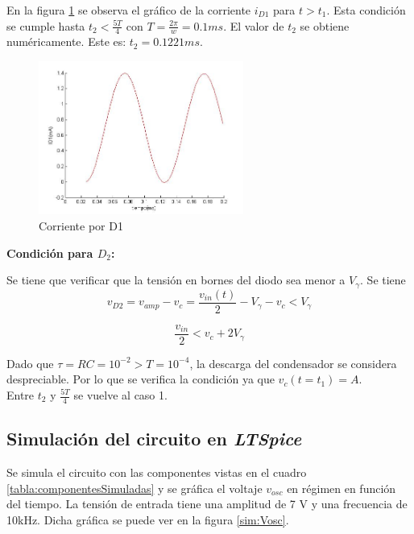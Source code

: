 En la figura \ref{fig:id1} se observa el gráfico de la corriente $i_{D1}$ para $t>t_1$. Esta condición se cumple hasta $t_2<\frac{5T}{4}$ con $T = \frac{2\pi}{w} = 0.1ms$. El valor de $t_2$ se obtiene numéricamente. Este es: $t_2 = 0.1221ms$.

\begin{figure}[H]
\centering
\includegraphics[width=0.6\textwidth]{DetectorDePicos/id1.jpg}
\caption{Corriente por D1}
\label{fig:id1}
\end{figure}

{\large \bf Condición para $D_2$:}

Se tiene que verificar que la tensión en bornes del diodo sea menor a $V_\gamma$. Se tiene
\begin{equation*}
	v_{D2} = v_{amp}-v_c = \frac{v_{in}(t)}{2} - V_\gamma -v_c < V_\gamma
\end{equation*}

\begin{equation*}
	\frac{v_{in}}{2} < v_c+2V_\gamma
\end{equation*}

Dado que $\tau = RC = 10^{-2} > T=10^{-4}$, la descarga del condensador se considera despreciable. Por lo que se verifica la condición ya que $v_c(t=t_1) = A$.\\

Entre $t_2$ y $\frac{5T}{4}$ se vuelve al caso 1.


\subsection{Simulación del circuito en \emph{LTSpice}}

Se simula el circuito con las componentes vistas en el cuadro \ref{tabla:componentesSimuladas} y se gráfica el voltaje $v_{osc}$ en régimen en función del tiempo. La tensión de entrada tiene una amplitud de 7 V y una frecuencia de 10kHz. Dicha gráfica se puede ver en la figura \ref{sim:Vosc}. %

